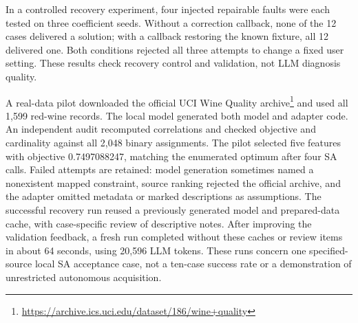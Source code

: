 In a controlled recovery experiment, four injected repairable faults were each tested on three coefficient
seeds. Without a correction callback, none of the 12 cases delivered a solution; with a callback restoring
the known fixture, all 12 delivered one. Both conditions rejected all three attempts to change a fixed user
setting. These results check recovery control and validation, not LLM diagnosis quality.

A real-data pilot downloaded the official UCI Wine Quality archive\footnote{\url{https://archive.ics.uci.edu/dataset/186/wine+quality}} and used all 1,599 red-wine records.
The local model generated both model and adapter code. An independent audit recomputed correlations and
checked objective and cardinality against all 2,048 binary assignments. The pilot selected five
features with objective 0.7497088247, matching the enumerated optimum after four SA calls. Failed attempts
are retained: model generation sometimes named a nonexistent mapped constraint, source ranking rejected
the official archive, and the adapter omitted metadata or marked descriptions as assumptions. The successful
recovery run reused a previously generated model and prepared-data cache, with case-specific review of
descriptive notes. After improving the validation feedback, a fresh run completed without these caches or
review items in about 64 seconds, using 20,596 LLM tokens. These runs concern one specified-source local SA
acceptance case, not a ten-case success rate or a demonstration
of unrestricted autonomous acquisition.



